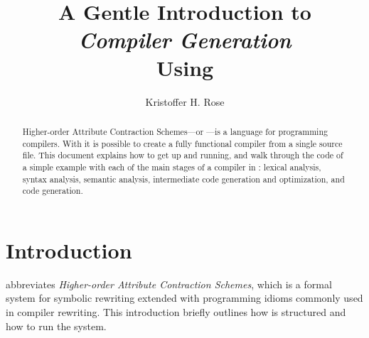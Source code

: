 \documentclass[11pt]{article} %
\title{A Gentle Introduction to\\\emph{Compiler Generation}\\Using \HAX\version}
\author{Kristoffer H. Rose}
\begin{document}
\maketitle

\begin{abstract}\noindent
  Higher-order Attribute Contraction Schemes---or \HAX---is a language for programming compilers.
  With \HAX it is possible to create a fully functional compiler from a single source file.  This
  document explains how to get \HAX up and running, and walk through the code of a simple example
  with each of the main stages of a compiler in \HAX: lexical analysis, syntax analysis, semantic
  analysis, intermediate code generation and optimization, and code generation.
\end{abstract}

\compacttableofcontents


\section{Introduction}

\HAX abbreviates \emph{Higher-order Attribute Contraction Schemes}, which is a formal system for
symbolic rewriting extended with programming idioms commonly used in compiler rewriting.  This
introduction briefly outlines how \HAX is structured and how to run the \HAX system.
\end{document}
